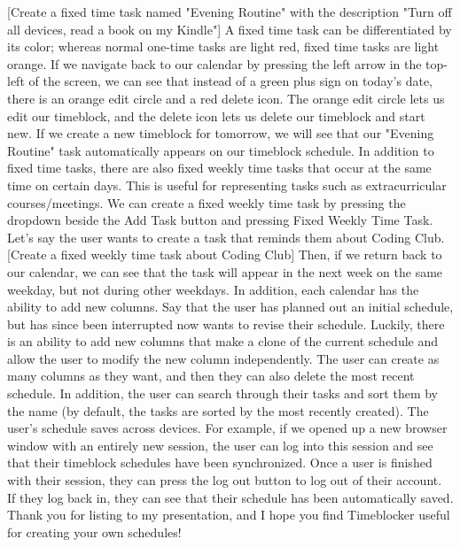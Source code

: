 \documentclass[notitlepage]{report}
\begin{document}
[Create a fixed time task named "Evening Routine" with the description "Turn off all devices, read a book on my Kindle"]
A fixed time task can be differentiated by its color; whereas normal one-time tasks are light red, fixed time tasks are light orange.
If we navigate back to our calendar by pressing the left arrow in the top-left of the screen, we can see that instead of a green plus sign on today's date, there is an orange edit circle and a red delete icon. The orange edit circle lets us edit our timeblock, and the delete icon lets us delete our timeblock and start new.
If we create a new timeblock for tomorrow, we will see that our "Evening Routine" task automatically appears on our timeblock schedule.
In addition to fixed time tasks, there are also fixed weekly time tasks that occur at the same time on certain days. This is useful for representing tasks such as extracurricular courses/meetings. We can create a fixed weekly time task by pressing the dropdown beside the Add Task button and pressing Fixed Weekly Time Task. Let's say the user wants to create a task that reminds them about Coding Club.
[Create a fixed weekly time task about Coding Club]
Then, if we return back to our calendar, we can see that the task will appear in the next week on the same weekday, but not during other weekdays.
In addition, each calendar has the ability to add new columns. Say that the user has planned out an initial schedule, but has since been interrupted now wants to revise their schedule. Luckily, there is an ability to add new columns that make a clone of the current schedule and allow the user to modify the new column independently.
The user can create as many columns as they want, and then they can also delete the most recent schedule.
In addition, the user can search through their tasks and sort them by the name (by default, the tasks are sorted by the most recently created).
The user's schedule saves across devices. For example, if we opened up a new browser window with an entirely new session, the user can log into this session and see that their timeblock schedules have been synchronized.
Once a user is finished with their session, they can press the log out button to log out of their account. If they log back in, they can see that their schedule has been automatically saved.
Thank you for listing to my presentation, and I hope you find Timeblocker useful for creating your own schedules!
\end{document}
